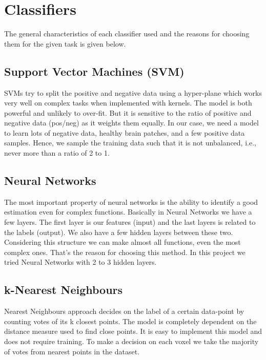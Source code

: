 \documentclass{article} %
\begin{document}
\section{Classifiers}

The general characteristics of each classifier used and the reasons for choosing them for the given task is given below. 
\subsection{Support Vector Machines (SVM)} 
SVMs try to split the positive and negative data using a hyper-plane which works very well on complex tasks when implemented with kernels. The model is both powerful and unlikely to over-fit. But it is sensitive to the ratio of positive and negative data (pos/neg) as it weights them equally. In our case, we need a model to learn lots of negative data, healthy brain patches, and a few positive data samples. Hence, we sample the training data such that it is not unbalanced, i.e., never more than a ratio of 2 to 1.

\subsection{ Neural Networks} 
The most important property of neural networks is the ability to identify a good estimation even for complex functions. Basically in Neural Networks we have a few layers. The first layer is our features (input) and the last layers is related to the labels (output). We also have a few hidden layers between these two. Considering this structure we can make almost all functions, even the most complex ones. That’s the reason for choosing this method. In this project we tried Neural Networks with 2 to 3 hidden layers.

\subsection{k-Nearest Neighbours} 
Nearest Neighbours approach decides on the label of a certain data-point by counting votes of its k closest points. The model is completely dependent on the distance measure used to find close points. It is easy to implement this model and does not require training. To make a decision on each voxel we take the majority of votes from nearest points in the dataset. 
\end{document}
